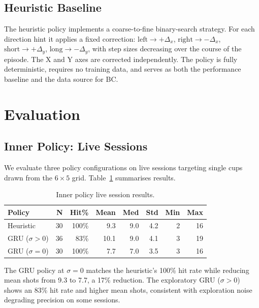 \documentclass[twoside,11pt]{article}
\begin{document}
\subsection{Heuristic Baseline}

The heuristic policy implements a coarse-to-fine binary-search strategy. For
each direction hint it applies a fixed correction:
$\text{left}{\to}{+}\Delta_x$, $\text{right}{\to}{-}\Delta_x$,
$\text{short}{\to}{+}\Delta_y$, $\text{long}{\to}{-}\Delta_y$, with step sizes
decreasing over the course of the episode. The X and Y axes are corrected
independently. The policy is fully deterministic, requires no training data,
and serves as both the performance baseline and the data source for BC.

\section{Evaluation}

\subsection{Inner Policy: Live Sessions}

We evaluate three policy configurations on live sessions targeting single cups
drawn from the $6\times5$ grid. Table~\ref{tab:inner} summarises results.

\begin{table}[H]
\centering
\caption{Inner policy live session results.}
\label{tab:inner}
\begin{tabular}{lrrrrrrr}
\toprule
Policy & N & Hit\% & Mean & Med & Std & Min & Max \\
\midrule
Heuristic              & 30 & 100\% & 9.3 & 9.0 & 4.2 & 2 & 16 \\
GRU ($\sigma{>}0$)     & 36 & 83\%  & 10.1& 9.0 & 4.1 & 3 & 19 \\
GRU ($\sigma{=}0$)     & 30 & 100\% & 7.7 & 7.0 & 3.5 & 3 & 16 \\
\bottomrule
\end{tabular}
\end{table}

The GRU policy at $\sigma{=}0$ matches the heuristic's 100\% hit rate while
reducing mean shots from 9.3 to 7.7, a 17\% reduction. The exploratory GRU
($\sigma{>}0$) shows an 83\% hit rate and higher mean shots, consistent with
exploration noise degrading precision on some sessions.
\end{document}
